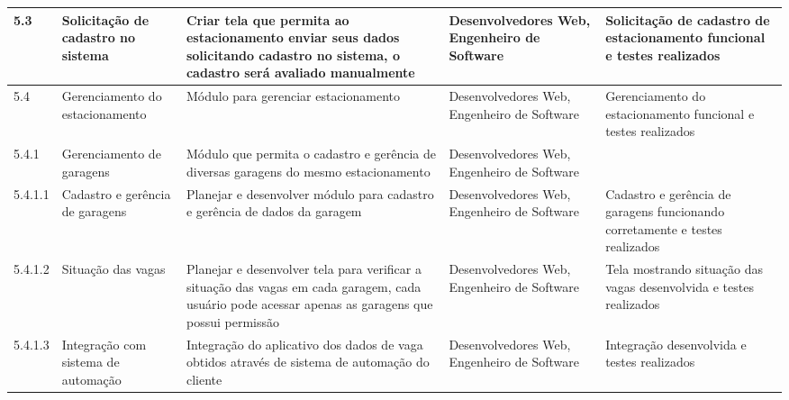 \begin{landscape}
\begin{longtable}{@{\extracolsep{\fill}}  l  p{}  p{}  p{}  p{}  }
		\midrule
		5.3         & Solicitação de cadastro no sistema                     & Criar tela que permita ao estacionamento enviar seus dados solicitando cadastro no sistema, o cadastro será avaliado manualmente                                                & Desenvolvedores Web, Engenheiro de Software                                                      & Solicitação de cadastro de estacionamento funcional e testes realizados                                \\*
		\midrule
		5.4         & Gerenciamento do estacionamento                          & Módulo para gerenciar estacionamento                                                                                                                                            & Desenvolvedores Web, Engenheiro de Software                                                      & Gerenciamento do estacionamento funcional e testes realizados                                            \\*
		\midrule
		5.4.1       & Gerenciamento de garagens                                & Módulo que permita o cadastro e gerência de diversas garagens do mesmo estacionamento                                                                                          & Desenvolvedores Web, Engenheiro de Software                                                      &                                                                                                          \\*
		\midrule
		5.4.1.1     & Cadastro e gerência de garagens                         & Planejar e desenvolver módulo para cadastro e gerência de dados da garagem                                                                                                     & Desenvolvedores Web, Engenheiro de Software                                                      & Cadastro e gerência de garagens funcionando corretamente e testes realizados                            \\*
		\midrule
		5.4.1.2     & Situação das vagas                                     & Planejar e desenvolver tela para verificar a situação das vagas em cada garagem, cada usuário pode acessar apenas as garagens que possui permissão                           & Desenvolvedores Web, Engenheiro de Software                                                      & Tela mostrando situação das vagas desenvolvida e testes realizados                                     \\*
		\midrule
		5.4.1.3     & Integração com sistema de automação                  & Integração do aplicativo dos dados de vaga obtidos através de sistema de automação do cliente                                                                               & Desenvolvedores Web, Engenheiro de Software                                                      & Integração desenvolvida e testes realizados                                                            \\*

\end{longtable}
\end{landscape}
